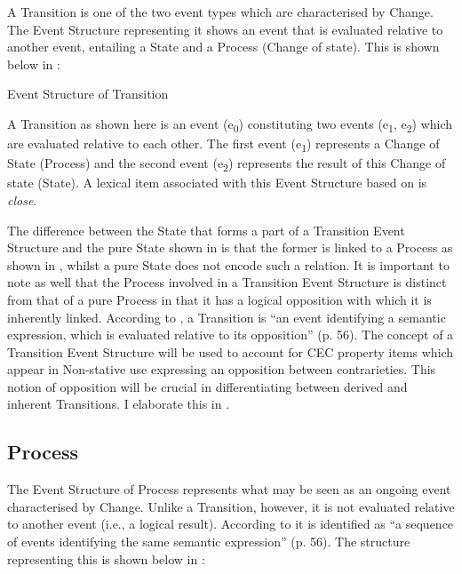 A Transition is one of the two event types which are characterised by
Change.  The Event Structure representing it shows an event that is
evaluated relative to another event, entailing a State and a Process
(Change of state).  This is shown below in :

\ea%
\label{ex:4:7}
Event Structure of Transition
\begin{center}\end{center}
\z

A Transition as shown here is an event (e\textsubscript{0})
constituting two events (e\textsubscript{1}, e\textsubscript{2}) which
are evaluated relative to each other.  The first event
(e\textsubscript{1}) represents a Change of State (Process) and the
second event (e\textsubscript{2}) represents the result of this Change
of state (State).  A lexical item associated with this Event Structure
based on \citet{Pustejovsky1991} is \textit{close}.

The difference between the State that forms a part of a Transition
Event Structure and the pure State shown in  is that the
former is linked to a Process as shown in , whilst a pure
State does not encode such a relation.  It is important to note as
well that the Process involved in a Transition Event Structure is
distinct from that of a pure Process in that it has a logical
opposition with which it is inherently linked.  According to
\citet{Pustejovsky1991}, a Transition is “an event identifying a
semantic expression, which is evaluated relative to its opposition”
(p. 56).  The concept of a Transition Event
Structure will be used to account for CEC property items which appear
in Non-stative use expressing an opposition between contrarieties.
This notion of opposition will be crucial in differentiating between
derived and inherent Transitions.  I elaborate this in
.

\subsection{Process}\label{sec:4.2.4}

The Event Structure of Process represents what may be seen as an
ongoing event characterised by Change.  Unlike a Transition, however,
it is not evaluated relative to another event (i.e.,  a logical
result).  According to \citet{Pustejovsky1991} it is identified as “a
sequence of events identifying the same semantic expression” (p. 56).
The structure representing this is shown below in :


